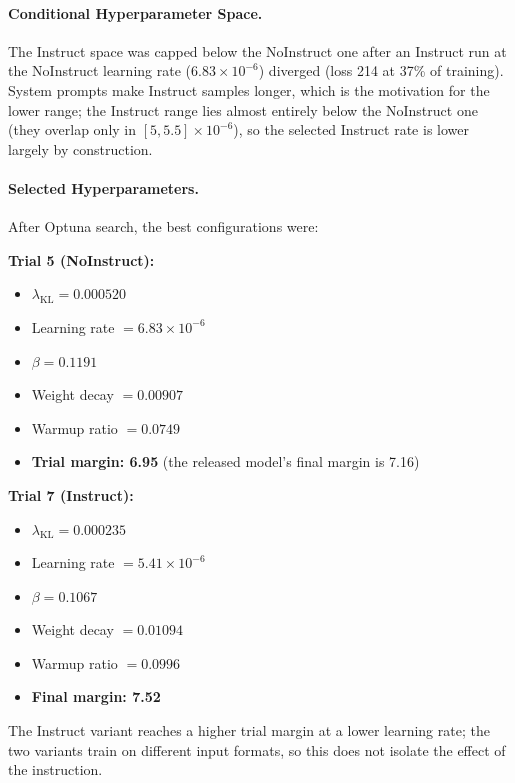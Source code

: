 \paragraph{Conditional Hyperparameter Space.} The Instruct space was capped below the NoInstruct one after an Instruct run at the NoInstruct learning rate ($6.83 \times 10^{-6}$) diverged (loss 214 at 37\% of training). System prompts make Instruct samples longer, which is the motivation for the lower range; the Instruct range lies almost entirely below the NoInstruct one (they overlap only in $[5, 5.5] \times 10^{-6}$), so the selected Instruct rate is lower largely by construction.

\paragraph{Selected Hyperparameters.} After Optuna search, the best configurations were:

\textbf{Trial 5 (NoInstruct):}
\begin{itemize}[leftmargin=*]
    \item $\lambda_{\text{KL}} = 0.000520$
    \item Learning rate $= 6.83 \times 10^{-6}$
    \item $\beta = 0.1191$
    \item Weight decay $= 0.00907$
    \item Warmup ratio $= 0.0749$
    \item \textbf{Trial margin: 6.95} (the released model's final margin is 7.16)
\end{itemize}

\textbf{Trial 7 (Instruct):}
\begin{itemize}[leftmargin=*]
    \item $\lambda_{\text{KL}} = 0.000235$
    \item Learning rate $= 5.41 \times 10^{-6}$
    \item $\beta = 0.1067$
    \item Weight decay $= 0.01094$
    \item Warmup ratio $= 0.0996$
    \item \textbf{Final margin: 7.52}
\end{itemize}

The Instruct variant reaches a higher trial margin at a lower learning rate; the two variants train on different input formats, so this does not isolate the effect of the instruction.

